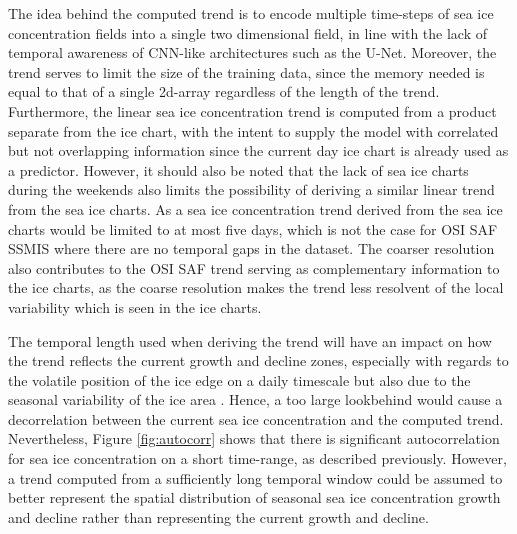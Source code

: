 \documentclass[../main/thesis.tex]{subfiles}
\begin{document}
The idea behind the computed trend is to encode multiple time-steps of sea ice concentration fields into a single two dimensional field, in line with the lack of temporal awareness of CNN-like architectures such as the U-Net. Moreover, the trend serves to limit the size of the training data, since the memory needed is equal to that of a single 2d-array regardless of the length of the trend. Furthermore, the linear sea ice concentration trend is computed from a product separate from the ice chart, with the intent to supply the model with correlated but not overlapping information since the current day ice chart is already used as a predictor. However, it should also be noted that the lack of sea ice charts during the weekends \citep{Dinessen2020} also limits the possibility of deriving a similar linear trend from the sea ice charts. As a sea ice concentration trend derived from the sea ice charts would be limited to at most five days, which is not the case for OSI SAF SSMIS where there are no temporal gaps in the dataset. The coarser resolution also contributes to the OSI SAF trend serving as complementary information to the ice charts, as the coarse resolution makes the trend less resolvent of the local variability which is seen in the ice charts.

The temporal length used when deriving the trend will have an impact on how the trend reflects the current growth and decline zones, especially with regards to the volatile position of the ice edge on a daily timescale but also due to the seasonal variability of the ice area \citep{Holland2016}. Hence, a too large lookbehind would cause a decorrelation between the current sea ice concentration and the computed trend. Nevertheless, Figure \ref{fig:autocorr} shows that there is significant autocorrelation for sea ice concentration on a short time-range, as described previously. However, a trend computed from a sufficiently long temporal window could be assumed to better represent the spatial distribution of seasonal sea ice concentration growth and decline rather than representing the current growth and decline.
\end{document}
